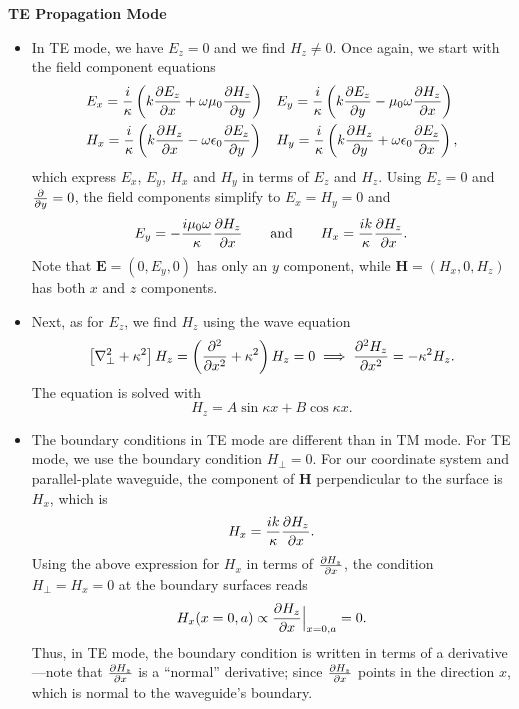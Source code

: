\documentclass[11pt, a4paper]{article}
\newcommand{\eqtext}[1]{\qquad \text{#1} \qquad}
\renewcommand{\vec}[1]{\bm{#1}} %
\newcommand{\E}{\vec{E}}  %
\renewcommand{\H}{\vec{H}}  %
\newcommand{\ee}{\epsilon_{0}}  %
\newcommand{\mm}{\mu_{0}}  %
\newcommand{\m}{\vec{m}}  %
\renewcommand{\laplacian}{\nabla^{2}}
\begin{document}
\textbf{TE Propagation Mode}
\begin{itemize}
	\item In TE mode, we have $ E_{z} = 0 $ and we find $ H_{z} \neq 0 $. Once again, we start with the field component equations
	\begin{align*}
		&E_{x} = \frac{i}{\kappa} \left(k \pdv{E_{z}}{x} + \omega \mm \pdv{H_{z}}{y}\right) && E_{y} = \frac{i}{\kappa}\left( k \pdv{E_{z}}{y} - \mm \omega \pdv{H_{z}}{x}\right)\\
		&H_{x} = \frac{i}{\kappa} \left(k\pdv{H_{z}}{x} - \omega \ee \pdv{E_{z}}{y}\right) && H_{y} = \frac{i}{\kappa}\left( k\pdv{H_{z}}{y} + \omega \ee \pdv{E_{z}}{x}\right),
	\end{align*}
	which express $ E_{x}$, $ E_{y} $, $ H_{x} $ and $ H_{y} $ in terms of $ E_{z} $ and $ H_{z} $. Using $ E_{z} = 0 $ and $ \pdv{y} = 0 $, the field components simplify to $ E_{x} = H_{y} = 0 $ and
	\begin{align*}
		E_{y} = -\frac{i\mm \omega}{\kappa} \pdv{H_{z}}{x} \eqtext{and} H_{x} = \frac{ik}{\kappa}\pdv{H_{z}}{x}.
	\end{align*}
	Note that $ \E = (0, E_{y}, 0) $ has only an $ y $ component, while $ \H = (H_{x}, 0, H_{z}) $ has both $ x $ and $ z $ components.
	
	\item Next, as for $ E_{z} $, we find $ H_{z} $ using the wave equation
	\begin{equation*}
		\left[\laplacian_{\perp} + \kappa^{2}\right]H_{z} = \left(\pdv[2]{}{x} + \kappa^{2}\right)H_{z} = 0 \implies \pdv[2]{H_{z}}{x} = - \kappa^{2}H_{z}.
	\end{equation*}
	The equation is solved with
	\begin{equation*}
		H_{z} = A \sin \kappa x + B \cos \kappa x.
	\end{equation*}
	
	\item The boundary conditions in TE mode are different than in TM mode. For TE mode, we use the boundary condition $ H_{\perp} = 0 $. For our coordinate system and parallel-plate waveguide, the component of $ \H $ perpendicular to the surface is $ H_{x} $, which is
	\begin{equation*}
		H_{x} = \frac{ik}{\kappa}\pdv{H_{z}}{x}.
	\end{equation*}
	Using the above expression for $ H_{x} $ in terms of $ \pdv{H_{z}}{x} $, the condition $ H_{\perp} = H_{x} = 0 $ at the boundary surfaces reads
	\begin{equation*}
		H_{x}(x = 0, a) \propto \pdv{H_{z}}{x}\Big|_{x = 0, a} = 0.
	\end{equation*}
	Thus, in TE mode, the boundary condition is written in terms of a derivative---note that $ \pdv{H_{z}}{x} $ is a ``normal'' derivative; since $ \pdv{H_{z}}{x}  $ points in the direction $ x $, which is normal to the waveguide's boundary. 
	

\end{itemize}
\end{document}
